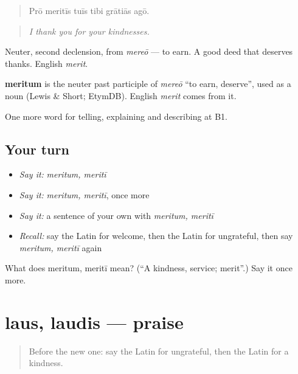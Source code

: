 \begin{quote}
Prō meritīs tuīs tibi grātiās agō.
\end{quote}

\begin{quote}
\emph{I thank you for your kindnesses.}
\end{quote}

Neuter, second declension, from \emph{mereō} — to earn. A good deed that deserves thanks. English \emph{merit}.

\begin{cousinweb}
\textbf{meritum} is the neuter past participle of \emph{mereō} \textquotedblleft{}to earn, deserve\textquotedblright{}, used as a noun (Lewis \& Short; EtymDB). English \emph{merit} comes from it.
\end{cousinweb}

\begin{grammarlens}[title={What you've built}]
One more word for telling, explaining and describing at B1.
\end{grammarlens}

\subsection*{Your turn}
\begin{itemize}
\raggedright
  \item \emph{Say it:} \emph{meritum, meritī}
  \item \emph{Say it:} \emph{meritum, meritī}, once more
  \item \emph{Say it:} a sentence of your own with \emph{meritum, meritī}
  \item \emph{Recall:} say the Latin for welcome, then the Latin for ungrateful, then say \emph{meritum, meritī} again
\end{itemize}

\begin{tcolorbox}[breakable,colback=teal!4,colframe=teal!35!black,title={Before you move on}]
What does meritum, meritī mean? (\textquotedblleft{}A kindness, service; merit\textquotedblright{}.) Say it once more.
\end{tcolorbox}
\section[laus, laudis]{laus, laudis — praise}

\label{lesson:LA-C512-laus}



\begin{quote}
Before the new one: say the Latin for ungrateful, then the Latin for a kindness.
\end{quote}

